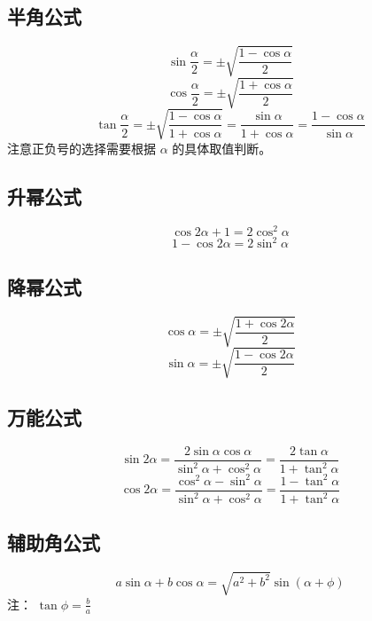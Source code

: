 \subsection{半角公式}
\begin{equation}
\sin\frac{\alpha}{2} = \pm\sqrt{\frac{1-\cos\alpha}{2}}
\end{equation}
\begin{equation}
\cos\frac{\alpha}{2}= \pm\sqrt{\frac{1+\cos\alpha}{2}}
\end{equation}
\begin{equation}
\tan\frac{\alpha}{2} = \pm\sqrt{\frac{1-\cos\alpha}{1+\cos\alpha}} = \frac{\sin\alpha}{1+\cos\alpha} = \frac{1-\cos\alpha}{\sin\alpha}
\end{equation}
注意正负号的选择需要根据 $\alpha$ 的具体取值判断。

\subsection{升幂公式}
\begin{equation}
\cos2\alpha + 1 = 2\cos^2\alpha
\end{equation}
\begin{equation}
1-\cos2\alpha = 2\sin^2\alpha
\end{equation}

\subsection{降幂公式}
\begin{equation}
\cos\alpha = \pm\sqrt{\frac{1+\cos2\alpha}{2}}
\end{equation}
\begin{equation}
\sin\alpha = \pm\sqrt{\frac{1-\cos2\alpha}{2}}
\end{equation}

\subsection{万能公式}
\begin{equation}
\sin2\alpha = \frac{2\sin\alpha \cos\alpha}{\sin^2\alpha + \cos^2\alpha} = \frac{2\tan\alpha}{1+\tan^2\alpha}
\end{equation}
\begin{equation}
\cos2\alpha = \frac{\cos^2\alpha-\sin^2\alpha}{\sin^2\alpha+\cos^2\alpha} = \frac{1-\tan^2\alpha}{1+\tan^2\alpha}
\end{equation}

\subsection{辅助角公式}
\begin{equation}
a\sin\alpha + b\cos\alpha = \sqrt{a^2+b^2}\sin(\alpha + \phi)
\end{equation}
注： $\tan\phi = \frac{b}{a}$

